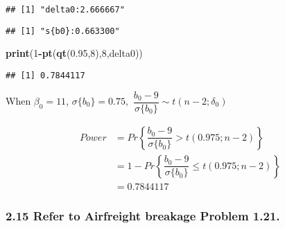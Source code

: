 \documentclass[]{article}
\newenvironment{Shaded}{\begin{snugshade}}{\end{snugshade}}
\newcommand{\KeywordTok}[1]{\textcolor[rgb]{0.13,0.29,0.53}{\textbf{#1}}}
\newcommand{\DecValTok}[1]{\textcolor[rgb]{0.00,0.00,0.81}{#1}}
\newcommand{\FloatTok}[1]{\textcolor[rgb]{0.00,0.00,0.81}{#1}}
\newcommand{\StringTok}[1]{\textcolor[rgb]{0.31,0.60,0.02}{#1}}
\newcommand{\OperatorTok}[1]{\textcolor[rgb]{0.81,0.36,0.00}{\textbf{#1}}}
\newcommand{\NormalTok}[1]{#1}
\begin{document}
\begin{Shaded}
\end{Shaded}

\begin{verbatim}
## [1] "delta0:2.666667"
\end{verbatim}

\begin{Shaded}
\end{Shaded}

\begin{verbatim}
## [1] "s{b0}:0.663300"
\end{verbatim}

\begin{Shaded}
\begin{Highlighting}[]
\KeywordTok{print}\NormalTok{(}\DecValTok{1}\OperatorTok{-}\KeywordTok{pt}\NormalTok{(}\KeywordTok{qt}\NormalTok{(}\FloatTok{0.95}\NormalTok{,}\DecValTok{8}\NormalTok{),}\DecValTok{8}\NormalTok{,delta0))}
\end{Highlighting}
\end{Shaded}

\begin{verbatim}
## [1] 0.7844117
\end{verbatim}

When \(\beta_0=11\), \(\sigma\{b_0\}=0.75,\)
\(\dfrac{b_0-9}{\sigma\{b_0\}}\sim t(n-2;\delta_0)\)

\begin{align*}
Power&=Pr\left\{\dfrac{b_0-9}{\sigma\{b_0\}}>t(0.975;n-2)\right\}\\
&=1-Pr\left\{\dfrac{b_0-9}{\sigma\{b_0\}}\leqslant t(0.975;n-2)\right\}\\
&=0.7844117
\end{align*}

\subsubsection{\texorpdfstring{2.15 Refer to \textbf{Airfreight
breakage} Problem
1.21.}{2.15 Refer to Airfreight breakage Problem 1.21.}}\label{refer-to-airfreight-breakage-problem-1.21.-1}
\end{document}
